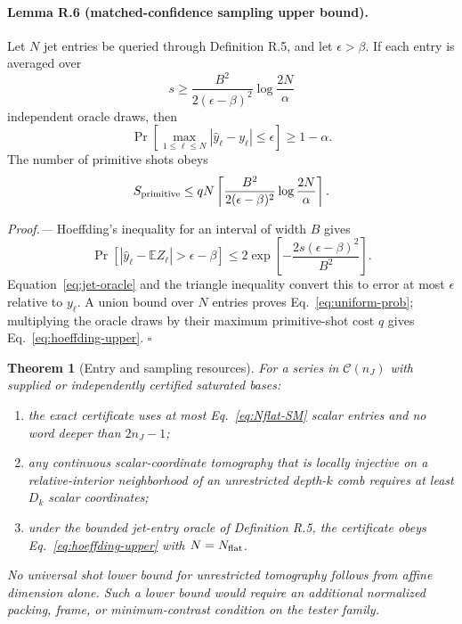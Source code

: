 \documentclass[aps,prl,reprint,superscriptaddress,nofootinbib]{revtex4-2}
\newcommand{\cC}{\mathcal C}
\newtheorem{theorem}{Theorem}
\begin{document}
\paragraph{Lemma R.6 (matched-confidence sampling upper bound).}
Let $N$ jet entries be queried through Definition R.5, and let $\epsilon>\beta$.  If each entry is averaged over
\begin{equation}
 s\ge
 \frac{B^2}{2(\epsilon-\beta)^2}
 \log\frac{2N}{\alpha}
 \label{eq:oracle-repetitions}
\end{equation}
independent oracle draws, then
\begin{equation}
 \Pr\!\left[
 \max_{1\le\ell\le N}|\widehat y_\ell-y_\ell|\le\epsilon
 \right]\ge1-\alpha.
 \label{eq:uniform-prob}
\end{equation}
The number of primitive shots obeys
\begin{equation}
 S_{\rm primitive}\le
 qN\left\lceil
 \frac{B^2}{2(\epsilon-\beta)^2}
 \log\frac{2N}{\alpha}
 \right\rceil.
 \label{eq:hoeffding-upper}
\end{equation}

\emph{Proof.---}
Hoeffding's inequality for an interval of width $B$ gives
\begin{equation}
 \Pr\!\left[
 |\widehat y_\ell-\mathbb EZ_\ell|>\epsilon-\beta
 \right]
 \le2\exp\!\left[-\frac{2s(\epsilon-\beta)^2}{B^2}\right].
\end{equation}
Equation~\eqref{eq:jet-oracle} and the triangle inequality convert this to error at most $\epsilon$ relative to $y_\ell$.  A union bound over $N$ entries proves Eq.~\eqref{eq:uniform-prob}; multiplying the oracle draws by their maximum primitive-shot cost $q$ gives Eq.~\eqref{eq:hoeffding-upper}. \hfill$\square$

\begin{theorem}[Entry and sampling resources]
\label{thm:R}
For a series in $\cC(n_J)$ with supplied or independently certified saturated bases:
\begin{enumerate}
\item the exact certificate uses at most Eq.~\eqref{eq:Nflat-SM} scalar entries and no word deeper than $2n_J-1$;
\item any continuous scalar-coordinate tomography that is locally injective on a relative-interior neighborhood of an unrestricted depth-$k$ comb requires at least $D_k$ scalar coordinates;
\item under the bounded jet-entry oracle of Definition R.5, the certificate obeys Eq.~\eqref{eq:hoeffding-upper} with $N=N_{\rm flat}$.
\end{enumerate}
No universal shot lower bound for unrestricted tomography follows from affine dimension alone.  Such a lower bound would require an additional normalized packing, frame, or minimum-contrast condition on the tester family.
\end{theorem}
\end{document}
